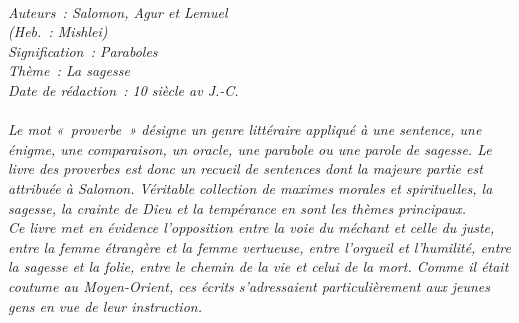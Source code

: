 \BFont
\noindent\hrulefill
{\footnotesize
\textit{
\bigskip
{\centering{}
\\Auteurs~: Salomon, Agur et Lemuel
\\(Heb.~: Mishlei)
\\Signification~: Paraboles
\\Thème~: La sagesse
\\Date de rédaction~: 10 siècle av J.-C.\\}
}
\textit{
\\Le mot «~proverbe~» désigne un genre littéraire appliqué à une sentence, une énigme, une comparaison, un oracle, une parabole ou une parole de sagesse. Le livre des proverbes est donc un recueil de sentences dont la majeure partie est attribuée à Salomon. Véritable collection de maximes morales et spirituelles, la sagesse, la crainte de Dieu et la tempérance en sont les thèmes principaux.
\\Ce livre met en évidence l'opposition entre la voie du méchant et celle du juste, entre la femme étrangère et la femme vertueuse, entre l'orgueil et l'humilité, entre la sagesse et la folie, entre le chemin de la vie et celui de la mort. Comme il était coutume au Moyen-Orient, ces écrits s'adressaient particulièrement aux jeunes gens en vue de leur instruction.\bigskip
}
}
\par\nobreak\noindent\hrulefill
